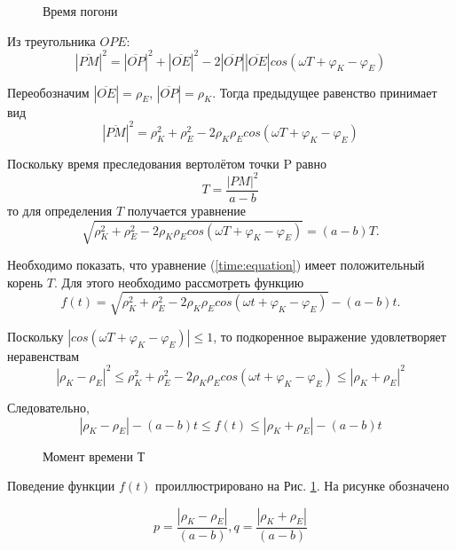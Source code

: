 \documentclass[12pt,a4paper,titlepage]{article}
\begin{document}
    \begin{figure}
      \centering
      \def\svgwidth{\columnwidth}
      
      \caption{Время погони}
    \end{figure}
    
    Из треугольника $OPE$:
    $$|\overline{PM}|^2 = |\overline{OP}|^2 + |\overline{OE}|^2 - 2|\overline{OP}||\overline{OE}|cos(\omega T +\varphi_K -\varphi_E)$$
    
    Переобозначим $|\overline{OE}| = \rho_E$, $|\overline{OP}| = \rho_K$.
    Тогда предыдущее равенство принимает вид
    $$|\overline{PM}|^2 = \rho_K^2 + \rho_E^2 - 2 \rho_K\rho_Ecos(\omega T + \varphi_K -\varphi_E)$$
    
    Поскольку время преследования вертолётом точки P равно
      $$
	T = \frac{|PM|^2}{a - b}
      $$
    то для определения $T$ получается уравнение
    \begin{equation}\label{time:equation}
      \sqrt{\rho_K^2 + \rho_E^2 - 2 \rho_K\rho_Ecos(\omega T + \varphi_K -\varphi_E)} = (a - b)T.
    \end{equation}
    
    Необходимо показать, что уравнение (\ref{time:equation}) имеет положительный корень $T$.
    Для этого необходимо рассмотреть функцию
    \begin{equation} \label{time:function}
      f(t) = \sqrt{\rho_K^2 + \rho_E^2 - 2 \rho_K\rho_Ecos(\omega t + \varphi_K -\varphi_E)} - (a - b)t.
    \end{equation}
    
    Поскольку $|cos(\omega T + \varphi_K - \varphi_E)| \leq 1$, то подкоренное выражение удовлетворяет неравенствам
    $$|\rho_K - \rho_E|^2 \leq \rho_K^2 + \rho_E^2 - 2 \rho_K\rho_Ecos(\omega t + \varphi_K -\varphi_E) \leq |\rho_K + \rho_E|^2 $$
    
    Следовательно,
    $$|\rho_K - \rho_E| - (a - b)t \leq f(t) \leq |\rho_K + \rho_E| - (a - b)t $$
    
    \begin{figure}
      
      \centering
      \def\svgwidth{\columnwidth}
      
      \caption{Момент времени Т}
      \label{fig:zero}
    \end{figure}
    
    Поведение функции $f(t)$ проиллюстрировано на Рис. \ref{fig:zero}.
    На рисунке обозначено 
    
    $$
      p = \frac{|\rho_K - \rho_E|}{(a - b)},
      q = \frac{|\rho_K + \rho_E|}{(a - b)}
    $$
    
\end{document}
